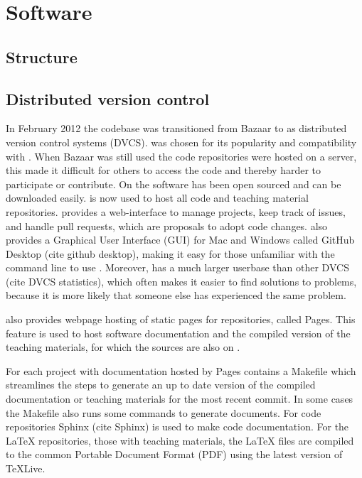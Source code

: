\chapter{Software}
\label{ch:software}

\section{Structure}


\section{Distributed version control}

In February 2012 the \hisparc codebase was transitioned from Bazaar \cite{bazaar} to \git \cite{git} as distributed version control systems (DVCS). \git was chosen for its popularity and compatibility with \github \cite{github}. When Bazaar was still used the code repositories were hosted on a \nikhef server, this made it difficult for others to access the code and thereby harder to participate or contribute. On \github the software has been open sourced and can be downloaded easily. \github is now used to host all \hisparc code and teaching material repositories. \github provides a web-interface to manage projects, keep track of issues, and handle pull requests, which are proposals to adopt code changes. \github also provides a Graphical User Interface (GUI) for Mac and Windows called GitHub Desktop (cite github desktop), making it easy for those unfamiliar with the command line to use \git. Moreover, \git has a much larger userbase than other DVCS (cite DVCS statistics), which often makes it easier to find solutions to problems, because it is more likely that someone else has experienced the same problem.

\github also provides webpage hosting of static pages for repositories, called \github Pages. This feature is used to host software documentation and the compiled version of the teaching materials, for which the sources are also on \github.

For each project with documentation hosted by \github Pages contains a Makefile which streamlines the steps to generate an up to date version of the compiled documentation or teaching materials for the most recent commit. In some cases the Makefile also runs some commands to generate documents. For code repositories Sphinx (cite Sphinx) is used to make code documentation. For the LaTeX repositories, those with teaching materials, the LaTeX files are compiled to the common Portable Document Format (PDF) using the latest version of TeXLive.


